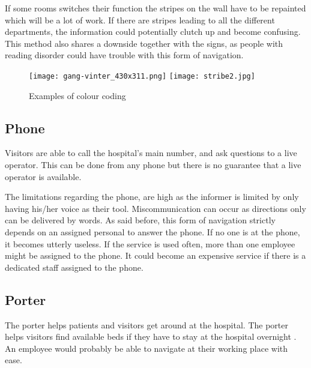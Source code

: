 If some rooms switches their function the stripes on the wall have to be repainted which will be a lot of work. If there are stripes leading to all the different departments, the information could potentially clutch up and become confusing. This method also shares a downside together with the signs, as people with reading disorder could have trouble with this form of navigation.

\begin{figure}[htb]
  \begin{center} 
    {\texttt{[image: gang-vinter\_430x311.png]}}
    \quad
    {\texttt{[image: stribe2.jpg]}}
  \end{center}
  \caption{Examples of colour coding}
\end{figure}



\subsection{Phone}
Visitors are able to call the hospital's main number, and ask questions to a live operator. This can be done from any phone but there is no guarantee that a live operator is available.
 
The limitations regarding the phone, are high as the informer is limited by only having his/her voice as their tool. Miscommunication can occur as directions only can be delivered by words. As said before, this form of navigation strictly depends on an assigned personal to answer the phone. If no one is at the phone, it becomes utterly useless.
If the service is used often, more than one employee might be assigned to the phone. It could become an expensive service if there is a dedicated staff assigned to the phone. 

\subsection{Porter}
The porter helps patients\cite{porter} and visitors get around at the hospital. The porter helps visitors find available beds if they have to stay at the hospital overnight \cite{ugd_port}. An employee would probably be able to navigate at their working place with ease.


